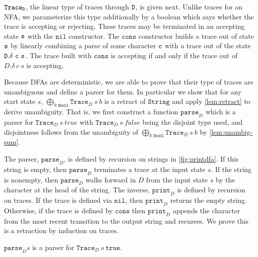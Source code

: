 \documentclass[acmsmall,nonacm]{acmart}
\newcommand{\StringGram}{\texttt{String}}
\newcommand{\Bool}{\mathtt{Bool}}
\newcommand{\true}{\mathtt{true}}
\newcommand{\nil}{\texttt{nil}}
\newcommand{\cons}{\texttt{cons}}
\newcommand{\Trace}{\texttt{Trace}}
\newcommand{\LinSigTy}[3]{\textstyle\bigoplus_{#1 : #2} #3}
\newcommand{\agdalogo}{%
  \usebox{\logoagdabox}}%
\newcommand{\zenodolink}{https://zenodo.org/records/15049780}
\newcommand{\Agda}{\href{\zenodolink}{\agdalogo}}
\newcommand{\pparse}{\mathtt{parse}}
\newcommand{\print}{\mathtt{print}}
\begin{document}
$\Trace_{\D}$, the linear type of traces through $\texttt{D}$, is given
next. Unlike traces for an NFA, we parameterize this type additionally
by a boolean which says whether the trace is accepting or
rejecting. These traces may be terminated in an accepting state $\texttt{s}$
with the $\nil$ constructor.  The $\cons$ constructor builds a trace
out of state $\texttt{s}$ by linearly combining a parse of some character $\texttt{c}$
with a trace out of the state $\texttt{D}.\delta~\texttt{c}~\texttt{s}$. The trace built with
$\cons$ is accepting if and only if the trace out of $D.\delta~c~s$ is
accepting.

Because DFAs are deterministic, we are able to prove that their type
of traces are unambiguous and define a parser for them. In particular
we show that for any start state $s$, ${\LinSigTy {b} {\Bool}
  \Trace_{D}~s~b}$ is a retract of $\StringGram$ and apply \cref{lem:retract} to
derive unambiguity. That is, we first
construct a function $\pparse_{D}$ which is a parser for
$\Trace_D~{s}~{true}$ with $\Trace_D~{s}~{false}$ being the disjoint
type used, and disjointness follows from the
unambiguity of $\LinSigTy {b} {\Bool} {\Trace_{D}~s~b}$ by \cref{lem:unambig-sum}.

The parser,
$\pparse_{D}$,
is defined by recursion on strings in \cref{fig:printdfa}. If this string is empty, then $\pparse_{D}$
terminates a trace at the input state $s$. If the
string is nonempty, then $\pparse_{D}$ walks forward in $D$ from the input state $s$ by
the character at the head of the string.
%
The inverse, $\print_{D}$ is defined by recursion on traces. If the trace is defined
via $\nil$, then $\print_{D}$ returns the empty string. Otherwise, if the trace
is defined by $\cons$ then $\print_{D}$ appends the character from the most
recent transition to the output
string and recurses.
%
We prove this is a retraction by induction on traces.

\begin{theorem}[\Agda]
  \label{thm:dfa-parser}
  $\pparse_D s$ is a parser for $\Trace_D~s~\true$.
\end{theorem}
\end{document}

